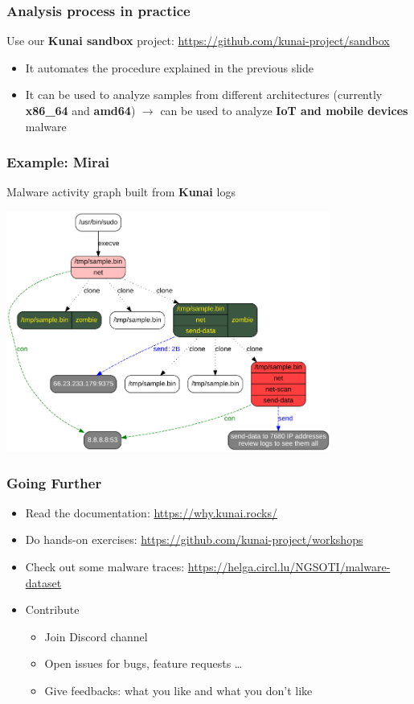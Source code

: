 \begin{frame}
	\frametitle{Analysis process in practice}

	Use our \textbf{Kunai sandbox} project: \url{https://github.com/kunai-project/sandbox}

	\vspace{1em}

	\begin{itemize}
		\item It automates the procedure explained in the previous slide
		\item It can be used to analyze samples from different architectures (currently \textbf{x86\_64} and \textbf{amd64}) $\rightarrow$  can be used to analyze \textbf{IoT and mobile devices} malware
	\end{itemize}
\end{frame}

\begin{frame}
	\frametitle{Example: Mirai}
	Malware activity graph built from \textbf{Kunai} logs
	\begin{center}
		\includegraphics[width=0.8\textwidth]{img/kunai-sample.png}
	\end{center}
\end{frame}

\begin{frame}
	\frametitle{Going Further}

	\begin{itemize}
		\item Read the documentation: \url{https://why.kunai.rocks/}
		\item Do hands-on exercises: \url{https://github.com/kunai-project/workshops}
		\item Check out some malware traces: \url{https://helga.circl.lu/NGSOTI/malware-dataset}
		\item Contribute
		      \begin{itemize}
			      \item Join Discord channel
			      \item Open issues for bugs, feature requests \ldots
			      \item Give feedbacks: what you like and what you don't like
		      \end{itemize}
	\end{itemize}
\end{frame}